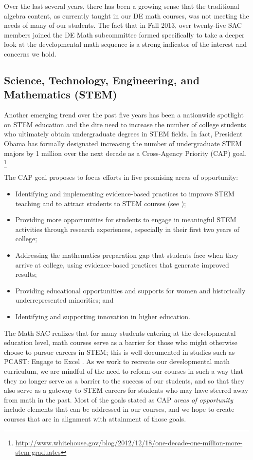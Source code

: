 Over the last several years, there has been a growing sense that the traditional
algebra content, as currently taught in our DE math courses, was not meeting the
needs of many of our students. The fact that in Fall 2013, over twenty-five SAC
members joined the DE Math subcommittee formed specifically to take a deeper
look at  the developmental math sequence is a strong indicator of the interest and
concerns we hold.

\subsection{Science, Technology, Engineering, and Mathematics (STEM)}
Another emerging trend over the past five years has been a nationwide spotlight
on STEM education and the dire need to increase the
number of college students who ultimately obtain undergraduate degrees in STEM fields. In
fact, President Obama has formally designated increasing the number of undergraduate STEM majors by 1 million over the next decade as a Cross-Agency Priority (CAP) goal. 
\footnote{\url{http://www.whitehouse.gov/blog/2012/12/18/one-decade-one-million-more-stem-graduates}}

The CAP goal proposes to focus efforts in five promising areas of opportunity:
\begin{itemize}
  \item Identifying and implementing evidence-based practices to improve STEM teaching
    and to attract students to STEM courses (see
    );
\item Providing more opportunities for students to engage in meaningful  STEM
activities through research experiences, especially in their first two years of
college;
\item Addressing the mathematics preparation gap that students face when they arrive
at college, using evidence-based practices that generate improved results;
\item Providing educational opportunities and supports for women and historically
underrepresented minorities; and 
\item Identifying and supporting innovation in higher
education.
\end{itemize}

The Math SAC realizes that for many students entering at the developmental
education level, math courses serve as a barrier for those who might otherwise
choose to pursue careers in STEM; this is well documented in studies such as
PCAST: Engage to Excel \cite{engagetoexcel}. As we work to recreate our developmental math curriculum, we are mindful of the need to reform our courses in such a way that they no longer serve as a barrier to the success of our students, and so that they also serve as a gateway to
STEM careers for students who may have steered away from math in the past.  Most
of the goals stated as CAP \emph{areas of opportunity} include elements that
can be addressed in our courses, and we hope to create courses that are in alignment with
attainment of those goals.

